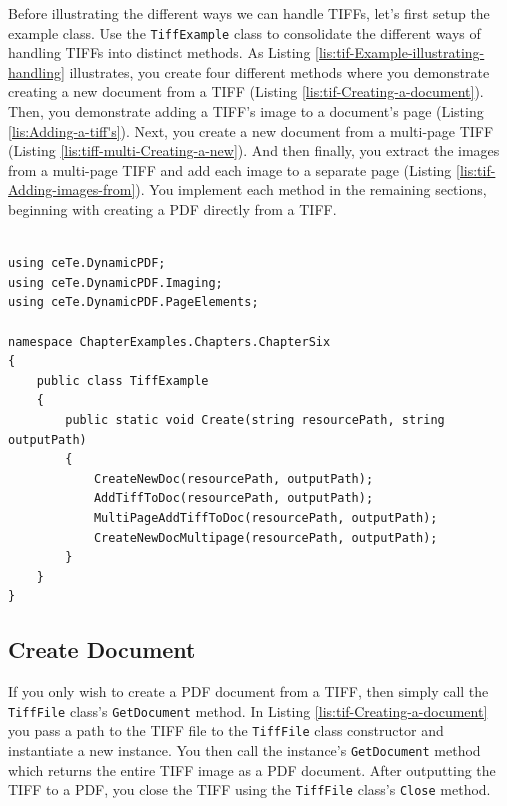 \documentclass[american]{tufte-book}
\numberwithin{equation}{section}
\numberwithin{figure}{section}
\begin{document}
{{Before illustrating the different ways we can handle TIFFs, let's
first setup the example class. Use the \texttt{TiffExample} class
to consolidate the different ways of handling TIFFs into distinct
methods. As Listing \ref{lis:tif-Example-illustrating-handling} illustrates,
you create four different methods where you demonstrate creating
a new document from a TIFF (Listing \ref{lis:tif-Creating-a-document}).
Then, you demonstrate adding a TIFF's image to a document's page (Listing
\ref{lis:Adding-a-tiff's}). Next, you create a new document from a
multi-page TIFF (Listing \ref{lis:tiff-multi-Creating-a-new}). And
then finally, you extract the images from a multi-page TIFF and add
each image to a separate page (Listing \ref{lis:tif-Adding-images-from}).
You implement each method in the remaining sections, beginning with
creating a PDF directly from a TIFF.

\bgroup{}
\begin{lstlisting}[caption={Handling TIFFs.},label={lis:tif-Example-illustrating-handling},basicstyle={\footnotesize\ttfamily},breaklines=true]

using ceTe.DynamicPDF;
using ceTe.DynamicPDF.Imaging;
using ceTe.DynamicPDF.PageElements;

namespace ChapterExamples.Chapters.ChapterSix
{
    public class TiffExample
    {
        public static void Create(string resourcePath, string outputPath)
        {
            CreateNewDoc(resourcePath, outputPath);
            AddTiffToDoc(resourcePath, outputPath);
            MultiPageAddTiffToDoc(resourcePath, outputPath);
            CreateNewDocMultipage(resourcePath, outputPath);
        }
    }
}
\end{lstlisting}
\leavevmode\egroup


\subsection{Create Document}

If you only wish to create a PDF document from a TIFF, then simply
call the \texttt{TiffFile} class's \texttt{GetDocument} method. In
Listing \ref{lis:tif-Creating-a-document} you pass a path to the TIFF
file to the \texttt{TiffFile} class constructor and instantiate a
new instance. You then call the instance's \texttt{GetDocument} method
which returns the entire TIFF image as a PDF document. After outputting
the TIFF to a PDF, you close the TIFF using the \texttt{TiffFile} class's
\texttt{Close} method.

}}
\end{document}
